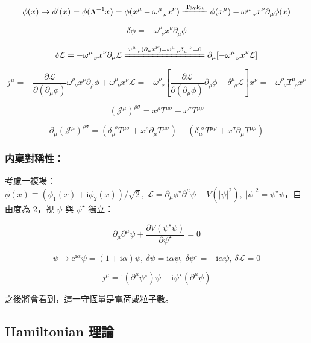 \documentclass{article}
\begin{document}
$$\phi(x)\to\phi'(x)=\phi(\Lambda^{-1}x)=\phi(x^{\mu}-\omega^{\mu}_{\ \ \nu}x^{\nu})\xlongequal{\mathrm{Taylor}}\phi(x^{\mu})-\omega^{\mu}_{\ \ \nu}x^{\nu}\partial_{\mu}\phi(x)$$

$$\delta\phi=-\omega^{\mu}_{\ \ \nu}x^{\nu}\partial_{\mu}\phi$$

$$\delta\mathcal{L}=-\omega^{\mu}_{\ \ \nu}x^{\nu}\partial_{\mu}\mathcal{L}\xlongequal{\omega^{\mu}_{\ \ \nu}(\partial_{\mu}x^{\nu})=\omega^{\mu}_{\ \ \nu}\delta_{\mu}^{\ \ \nu}=0}\partial_{\mu}[-\omega^{\mu}_{\ \ \nu}x^{\nu}\mathcal{L}]$$

$$j^{\mu}=-\frac{\partial\mathcal{L}}{\partial(\partial_{\mu}\phi)}\omega^{\rho}_{\ \ \nu}x^{\nu}\partial_{\rho}\phi+\omega^{\mu}_{\ \ \nu}x^{\nu}\mathcal{L}=-\omega^{\rho}_{\ \ \nu}[\frac{\partial\mathcal{L}}{\partial(\partial_{\mu}\phi)}\partial_{\rho}\phi-\delta^{\mu}_{\ \ \rho}\mathcal{L}]x^{\nu}=-\omega^{\rho}_{\ \ \nu}T^{\mu}_{\ \ \rho}x^{\nu}$$

$$(\mathcal{J^{\mu}})^{\rho\sigma}=x^{\rho}T^{\mu\sigma}-x^{\sigma}T^{\mu\rho}$$

$$\partial_{\mu}(\mathcal{J^{\mu}})^{\rho\sigma}=(\delta_{\mu}^{\ \ \rho}T^{\mu\sigma}+x^{\rho}\partial_{\mu}T^{\mu\sigma})-(\delta_{\mu}^{\ \ \sigma}T^{\mu\rho}+x^{\sigma}\partial_{\mu}T^{\mu\rho})$$

\subsubsection{内稟對稱性：}

考慮一複場：$\phi(x)\equiv(\phi_1(x)+\mathrm{i}\phi_2(x))/\sqrt{2},\ \mathcal{L}=\partial_{\mu}\phi^{\star}\partial^{\mu}\psi-V(|\psi|^2),\ |\psi|^2=\psi^{\star}\psi$，自由度為 $2$，視 $\psi$ 與 $\psi^{\star}$ 獨立：

$$\partial_{\mu}\partial^{\mu}\psi+\frac{\partial V(\psi^{\star}\psi)}{\partial\psi^{\star}}=0$$

$$\psi\to\mathrm{e}^{\mathrm{i}\alpha}\psi=(1+\mathrm{i}\alpha)\psi,\ \delta\psi=\mathrm{i}\alpha\psi,\ \delta\psi^{\star}=-\mathrm{i}\alpha\psi,\ \delta\mathcal{L}=0$$

$$j^{\mu}=\mathrm{i}(\partial^{\mu}\psi^{\star})\psi-\mathrm{i}\psi^{\star}(\partial^{\mu}\psi)$$

之後將會看到，這一守恆量是電荷或粒子數。

\subsection{Hamiltonian 理論}
\end{document}
